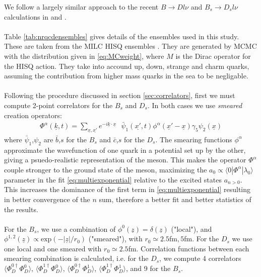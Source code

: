 We follow a largely similar approach to the recent $B\to Dl\nu$ and $B_s\to D_sl\nu$ calculations in \cite{Na:2015kha} and \cite{Monahan:2017uby}.
\\ \\
Table \ref{tab:nrqcdensembles} gives details of the ensembles used in this study. These are taken from the MILC HISQ ensembles \cite{Bazavov:2012xda}. They are generated by MCMC with the distribution given in \eqref{eq:MCweight}, where $M$ is the Dirac operator for the HISQ action. They take into accound up, down, strange and charm quarks, assuming the contribution from higher mass quarks in the sea to be negligable.
\\ \\
Following the procedure discussed in section \ref{sec:correlators}, first we must compute 2-point correlators for the $B_s$ and $D_s$. In both cases we use \textit{smeared} creation operators:
\begin{align}
	\Phi^{\alpha}(\underline{k},t) = \sum_{\underline{x},\underline{x'}} e^{-i\underline{k}\cdot\underline{x}} \text{ } \bar{\psi}_1(\underline{x'},t)\phi^{\alpha}(\underline{x}'-\underline{x}) \gamma_5 \psi_2(\underline{x})
\end{align}
where $\bar{\psi}_1$,$\psi_2$ are $\bar{b}$,$s$ for the $B_s$ and $\bar{c}$,$s$ for the $D_s$. The smearing functions $\phi^{\alpha}$ approximate the wavefunction of one quark in a potential set up by the other, giving a psuedo-realistic representation of the meson. This makes the operator $\Phi^{\alpha}$ couple stronger to the ground state of the meson, maximizing the $a_0 \propto \langle0 |\Phi^{\alpha}|\lambda_0\rangle$ parameter in the fit \eqref{eq:multiexponential} relative to the excited states $a_{n>0}$. This increases the dominance of the first term in \eqref{eq:multiexponential} resulting in better convergence of the $n$ sum, therefore a better fit and better statistics of the results.
\\ \\
For the $B_s$, we use a combination of $\phi^0(\underline{z})=\delta(\underline{z})$ ("local"), and $\phi^{1,2}(\underline{z}) \propto \text{exp}(-|\underline{z}|/r_0)$ ("smeared"), with $r_0 \simeq 2.5$fm$, 5$fm. For the $D_s$ we use one local and one smeared with $r_0\simeq2.5$fm. Correlation functions between each smearing combination is calculated, i.e. for the $D_s$, we compute 4 correlators $\langle \Phi^{0\dagger}_D\Phi_D^0 \rangle$, $\langle \Phi^{1\dagger}_D\Phi_D^0 \rangle$, $\langle \Phi^{0\dagger}_D\Phi_D^1 \rangle$, $\langle \Phi^{1\dagger}_D\Phi_D^1 \rangle$, and 9 for the $B_s$.
